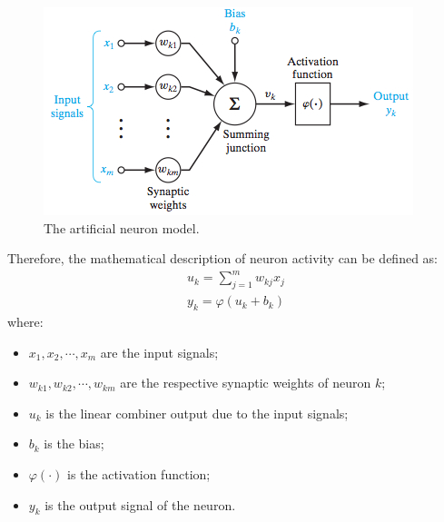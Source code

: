 \begin{figure}[t]
	\label{fig:artificial_neuron}
	\centering
	\includegraphics[width=0.8\linewidth]{img/NeuronModel.jpg}
	\caption{The artificial neuron model.}
\end{figure}

Therefore, the mathematical description of neuron activity can be defined as:
\begin{eqnarray}
{ u }_{ k }=\sum _{ j=1 }^{ m }{ { w }_{ kj } } { x }_{ j }\\ 
{ y }_{ k }=\varphi \left( { u }_{ k }+b_{ k } \right)
\end{eqnarray}
where:
\begin{itemize}
	\item ${ x }_{ 1 },{ x }_{ 2 },\cdots ,{ x }_{ m }$ are the input signals;
	\item ${ w }_{ k1 },{ w }_{ k2 },\cdots ,{ w }_{ km }$ are the respective synaptic weights of neuron $k$;
	\item $u_k$ is the linear combiner output due to the input signals;
	\item $b_k$ is the bias;
	\item $\varphi(\cdot)$ is the activation function;
	\item $y_k$ is the output signal of the neuron.
\end{itemize}

